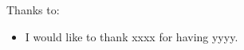 \noindent
Thanks to:
\begin{itemize}
    \item I would like to thank xxxx for having yyyy.
\end{itemize}
